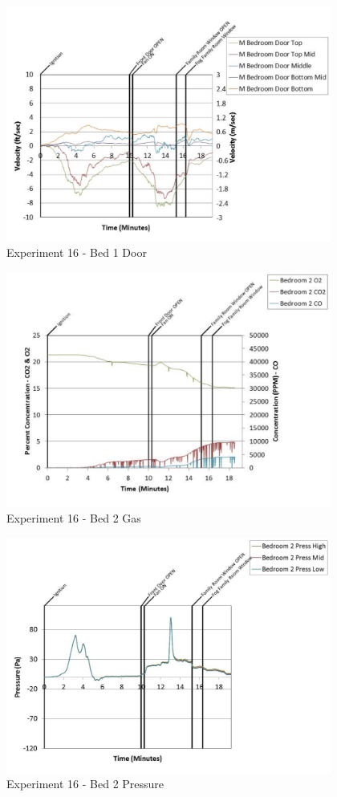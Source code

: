 \documentclass{article}
\begin{document}
\begin{appendices}
	\clearpage

	\begin{figure}[h!]
		\centering
		\includegraphics[height=3.05in]{0_Images/Results_Charts/Exp_16_Charts/Bed1Door.pdf}
		\caption{Experiment 16 - Bed 1 Door}
	\end{figure}
 

	\begin{figure}[h!]
		\centering
		\includegraphics[height=3.05in]{0_Images/Results_Charts/Exp_16_Charts/Bed2Gas.pdf}
		\caption{Experiment 16 - Bed 2 Gas}
	\end{figure}
 
	\clearpage

	\begin{figure}[h!]
		\centering
		\includegraphics[height=3.05in]{0_Images/Results_Charts/Exp_16_Charts/Bed2Pressure.pdf}
		\caption{Experiment 16 - Bed 2 Pressure}
	\end{figure}
 


\end{appendices}
\end{document}
